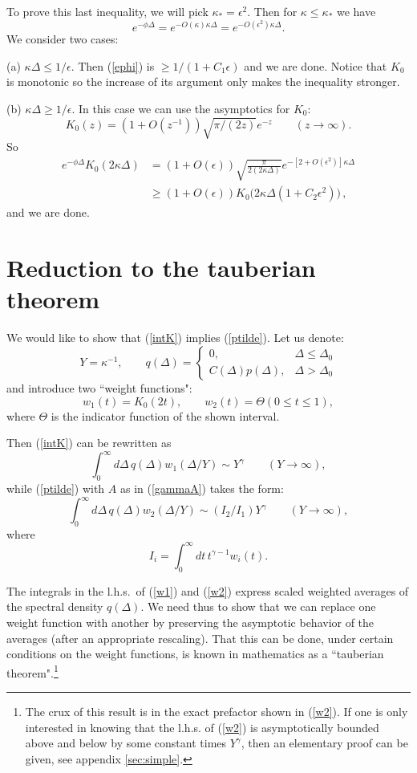 \documentclass[12pt]{article}
\newcommand{\reef}[1]{(\ref{#1})}
\def\eps{\epsilon}
\newcommand{\beq}{\begin{equation}}
\newcommand{\eeq}{\end{equation}}
\def\ge{\geqslant}
\def\le{\leqslant}
\def\eps{\epsilon}
\newcommand{\D}{\Delta}
\numberwithin{equation}{section}
\begin{document}
To prove this last inequality, we will pick $\kappa_*=\eps^2$. Then for $\kappa\le \kappa_*$ we have
\beq
\label{ephi}
e^{-\phi \Delta} = e^{-O(\kappa)\kappa\Delta } = e^{-O(\eps^2) \kappa\Delta}.
\eeq
We consider two cases:

(a) $\kappa\Delta\le 1/\eps$. Then \reef{ephi} is $\ge 1/(1+C_1 \eps)$ and we are done. Notice that $K_0$ is monotonic so the increase of its argument only makes the inequality stronger.

(b) $\kappa\Delta\ge 1/\eps$. In this case we can use the asymptotics for $K_0$:
\beq
K_0(z)= (1+O(z^{-1}))\sqrt{\pi/(2 z)}e^{-z}\qquad(z\to\infty).
\eeq
So
\begin{align}
e^{-\phi \Delta} K_0(2\kappa\D) &= (1+O(\eps))\sqrt{\frac{\pi}{2 (2\kappa\D)}}e^{-[2+O(\eps^2)]\kappa\D} \\
&\ge (1+O(\eps)) K_0\bigl(2\kappa\D(1+C_2 \eps^2)\bigr)\,,
\end{align}
and we are done.

\section{Reduction to the tauberian theorem}
\label{red}

We would like to show that \reef{intK} implies \reef{ptilde}. Let us denote:
\beq
\label{notation0}
Y=\kappa^{-1},\qquad q(\Delta)=\begin{cases} 0,&\Delta\le \Delta_0\\
C(\Delta)p(\Delta),& \Delta>\Delta_0\end{cases}
\eeq
and introduce two ``weight functions":
\beq
\label{notation}
w_1(t)= K_0(2t),\qquad w_2(t) = \Theta(0\le t\le1),
\eeq
where $\Theta$ is the indicator function of the shown interval.

Then \reef{intK} can be rewritten as
\beq
\label{w1}
\int_0^\infty d\Delta\,q(\Delta) w_1(\Delta/Y) \sim Y^\gamma \qquad (Y\to \infty),
\eeq
while \reef{ptilde} with $A$ as in \reef{gammaA} takes the form:
\beq
\label{w2}
\int_0^\infty d\Delta\,q(\Delta)  w_2(\Delta/Y) \sim (I_2/I_1) Y^\gamma\qquad (Y\to \infty),
\eeq
where 
\beq
I_i = \int_0^\infty dt\,t^{\gamma-1}w_i(t).
\eeq

The integrals in the l.h.s.~of \reef{w1} and \reef{w2} express scaled weighted averages of the spectral density $q(\D)$. We need thus to show that we can replace one weight function with another by preserving the asymptotic behavior of the averages (after an appropriate rescaling). That this can be done, under certain conditions on the weight functions, is known in mathematics as a ``tauberian theorem".\footnote{The crux of this result is in the exact prefactor shown in \reef{w2}. If one is only interested in knowing that the l.h.s. of \reef{w2} is asymptotically bounded above and below by some constant times $Y^\gamma$, then an elementary proof can be given, see appendix \ref{sec:simple}.} 
\end{document}
